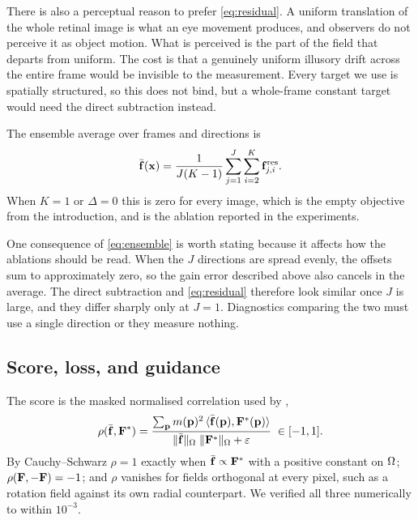 There is also a perceptual reason to prefer \eqref{eq:residual}. A uniform
translation of the whole retinal image is what an eye movement produces, and
observers do not perceive it as object motion. What is perceived is the part of
the field that departs from uniform. The cost is that a genuinely uniform
illusory drift across the entire frame would be invisible to the measurement.
Every target we use is spatially structured, so this does not bind, but a
whole-frame constant target would need the direct subtraction instead.

The ensemble average over frames and directions is
\begin{equation}
\bar{\mathbf{f}}(\mathbf{x})=\frac{1}{J(K-1)}\sum_{j=1}^{J}\sum_{i=2}^{K}
\mathbf{f}^{\text{res}}_{j,i}.
\label{eq:ensemble}
\end{equation}
When $K=1$ or $\Delta=0$ this is zero for every image, which is the empty
objective from the introduction, and is the ablation reported in the
experiments.

One consequence of \eqref{eq:ensemble} is worth stating because it affects how
the ablations should be read. When the $J$ directions are spread evenly, the
offsets sum to approximately zero, so the gain error described above also
cancels in the average. The direct subtraction and \eqref{eq:residual}
therefore look similar once $J$ is large, and they differ sharply only at
$J=1$. Diagnostics comparing the two must use a single direction or they
measure nothing.

\subsection{Score, loss, and guidance}
\label{sec:loss}

The score is the masked normalised correlation used by
\citet{rosario2026illusory},
\begin{equation}
\rho(\bar{\mathbf{f}},\mathbf{F}^\ast)=
\frac{\sum_{\mathbf{p}}m(\mathbf{p})^2\,\langle\bar{\mathbf{f}}(\mathbf{p}),\mathbf{F}^\ast(\mathbf{p})\rangle}
     {\lVert\bar{\mathbf{f}}\rVert_{\Omega}\;\lVert\mathbf{F}^\ast\rVert_{\Omega}+\varepsilon}
\;\in[-1,1].
\label{eq:rho}
\end{equation}
By Cauchy--Schwarz $\rho=1$ exactly when $\bar{\mathbf{f}}\propto\mathbf{F}^\ast$ with a
positive constant on $\Omega$; $\rho(\mathbf{F},-\mathbf{F})=-1$; and $\rho$ vanishes for fields
orthogonal at every pixel, such as a rotation field against its own radial
counterpart. We verified all three numerically to within $10^{-3}$.

